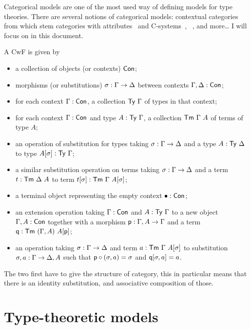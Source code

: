 Categorical models are one of the most used way of defining models for type
theories. There are several notions of categorical models:
contextual categories~ from which stem
categories with attributes~ and
C-systems~,
~, and more\dots
I will focus on  in this document.

A \acrshort{CwF} is given by
\begin{itemize}
  \item a collection of objects (or contexts) \(\mathsf{Con}\);
  \item morphisms (or substitutions) \(\sigma : \Gamma \to \Delta\) between contexts
  \(\Gamma, \Delta : \mathsf{Con}\);
  \item for each context \(\Gamma : \mathsf{Con}\), a collection \(\mathsf{Ty}\ \Gamma\) of types in
  that context;
  \item for each context \(\Gamma : \mathsf{Con}\) and type \(A : \mathsf{Ty}\ \Gamma\), a collection
  \(\mathsf{Tm}\ \Gamma\ A\) of terms of type \(A\);
  \item an operation of substitution for types taking \(\sigma : \Gamma \to \Delta\)
  and a type \(A : \mathsf{Ty}\ \Delta\) to type \(A[\sigma] : \mathsf{Ty}\ \Gamma\);
  \item a similar substitution operation on terms taking \(\sigma : \Gamma \to \Delta\)
  and a term \(t : \mathsf{Tm}\ \Delta\ A\) to term \(t[\sigma] : \mathsf{Tm}\ \Gamma\ A[\sigma]\);
  \item a terminal object representing the empty context \(\bullet : \mathsf{Con}\);
  \item an extension operation taking \(\Gamma : \mathsf{Con}\) and \(A : \mathsf{Ty}\ \Gamma\)
  to a new object \(\Gamma, A : \mathsf{Con}\) together with a morphism
  \(\mathsf{p} : \Gamma, A \to \Gamma\) and a term \(\pq : \CTm\ (\Ga, A)\ A[\pp]\);
  \item an operation taking \(\sigma : \Gamma \to \Delta\) and term
  \(a : \CTm\ \Ga\ A[\sigma]\) to substitution \(\sigma, a : \Gamma \to \Delta, A\)
  such that \(\mathsf{p} \circ (\sigma, a) = \sigma\) and \(\mathsf{q}[\sigma, a] = a\).
\end{itemize}
The two first have to give the structure of category, this in particular means
that there is an identity substitution, and associative composition of those.


\section{Type-theoretic models}

